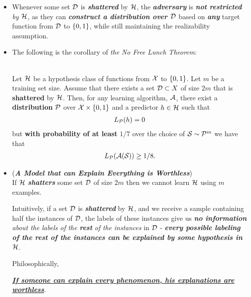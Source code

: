 \documentclass[11pt]{article}
\begin{document}
\begin{itemize}
\item \begin{remark}
Whenever some set ${\mathcal D}$ is \emph{\textbf{shattered}} by ${\mathcal H}$, the \emph{\textbf{adversary}} is \emph{\textbf{not restricted} by ${\mathcal H}$}, as they can \emph{\textbf{construct a distribution over ${\mathcal D}$}} based on \emph{\textbf{any}} target function from ${\mathcal D}$ to $\left\{0,1\right\}$, while still maintaining the realizability assumption. 
\end{remark}

\item The following is the corollary of \emph{the No Free Lunch Theorem}:
\begin{corollary} \citep{shalev2014understanding}\\
Let ${\mathcal H}$ be a hypothesis class of functions from ${\mathcal X}$ to $\left\{0,1\right\}$. Let $m$ be a training set size. Assume that there exists a set ${\mathcal D} \subset X$ of size $2m$ that is \textbf{shattered} by ${\mathcal H}$. Then, for any learning algorithm, ${\mathcal A}$, there exist a \textbf{distribution} ${\mathcal P}$ over ${\mathcal X} \times \left\{0,1\right\}$
and a predictor $h \in {\mathcal H}$ such that 
\begin{align*}
L_{{\mathcal P}}(h) = 0
\end{align*}
but \textbf{with probability of at least} $1/7$ over the choice of ${\mathcal S} \sim {\mathcal P}^m$ we have that 
\begin{align*}
L_{{\mathcal P}}({\mathcal A}({\mathcal S})) \ge 1/8.
\end{align*}
\end{corollary}

\item \begin{remark} (\emph{\textbf{A Model that can Explain Everything is Worthless}})\\
If ${\mathcal H}$ \emph{\textbf{shatters}} some set ${\mathcal D}$ of size $2m$ then we cannot learn ${\mathcal H}$ using $m$ examples. 

Intuitively, if a set ${\mathcal D}$ is \emph{\textbf{shattered}} by ${\mathcal H}$, and we receive a sample containing half the instances of ${\mathcal D}$, the labels of these instances give us \emph{\textbf{no information} about the labels of the \textbf{rest} of the instances} in ${\mathcal D}$ - \emph{\textbf{every possible labeling of the rest of the instances can be explained by some hypothesis in ${\mathcal H}$}}. 

Philosophically,

\underline{\emph{\textbf{If someone can explain every phenomenon, his explanations are worthless}}}.
\end{remark}


\end{itemize}
\end{document}

